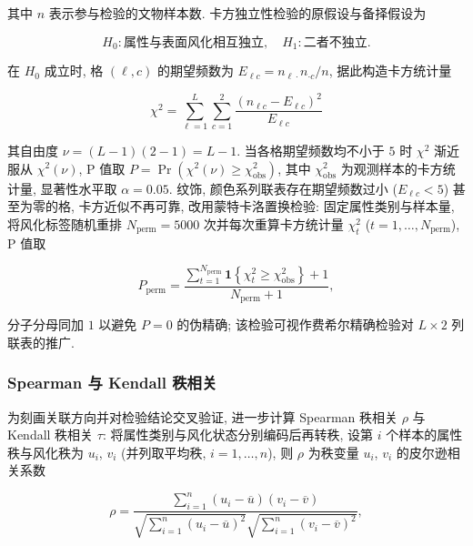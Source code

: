 \documentclass{ctexart}
\begin{document}
其中 $n$ 表示参与检验的文物样本数. 卡方独立性检验的原假设与备择假设为

\begin{equation*}
H_{0}:\text{属性与表面风化相互独立},\quad{}H_{1}:\text{二者不独立}.
\end{equation*}

在 $H_{0}$ 成立时, 格 $\left(\ell,c\right)$ 的期望频数为 $E_{\ell{}c}=n_{\ell\cdot}n_{\cdot{}c}/n$, 据此构造卡方统计量

\begin{equation*}
\chi^{2}=\sum_{\ell=1}^{L}\sum_{c=1}^{2}\frac{\left(n_{\ell{}c}-E_{\ell{}c}\right)^{2}}{E_{\ell{}c}}
\end{equation*}

其自由度 $\nu=\left(L-1\right)\left(2-1\right)=L-1$. 当各格期望频数均不小于 $5$ 时 $\chi^{2}$ 渐近服从 $\chi^{2}\left(\nu\right)$, P 值取 $P=\Pr\left(\chi^{2}\left(\nu\right)\ge\chi_{\mathrm{obs}}^{2}\right)$, 其中 $\chi_{\mathrm{obs}}^{2}$ 为观测样本的卡方统计量, 显著性水平取 $\alpha=0.05$. 纹饰, 颜色系列联表存在期望频数过小 ($E_{\ell{}c}<5$) 甚至为零的格, 卡方近似不再可靠, 改用蒙特卡洛置换检验: 固定属性类别与样本量, 将风化标签随机重排 $N_{\mathrm{perm}}=5000$ 次并每次重算卡方统计量 $\chi_{t}^{2}$ ($t=1,\dots,N_{\mathrm{perm}}$), P 值取

\begin{equation*}
P_{\mathrm{perm}}=\frac{\sum_{t=1}^{N_{\mathrm{perm}}}\mathbf{1}\left\{\chi_{t}^{2}\ge\chi_{\mathrm{obs}}^{2}\right\}+1}{N_{\mathrm{perm}}+1},
\end{equation*}

分子分母同加 $1$ 以避免 $P=0$ 的伪精确; 该检验可视作费希尔精确检验对 $L\times2$ 列联表的推广.


\subsubsection{Spearman 与 Kendall 秩相关}

为刻画关联方向并对检验结论交叉验证, 进一步计算 Spearman 秩相关 $\rho$ 与 Kendall 秩相关 $\tau$: 将属性类别与风化状态分别编码后再转秩, 设第 $i$ 个样本的属性秩与风化秩为 $u_{i}$, $v_{i}$ (并列取平均秩, $i=1,\dots,n$), 则 $\rho$ 为秩变量 $u_{i}$, $v_{i}$ 的皮尔逊相关系数

\begin{equation*}
\rho=\frac{\sum_{i=1}^{n}\left(u_{i}-\overline{u}\right)\left(v_{i}-\overline{v}\right)}{\sqrt{\sum_{i=1}^{n}\left(u_{i}-\overline{u}\right)^{2}}\sqrt{\sum_{i=1}^{n}\left(v_{i}-\overline{v}\right)^{2}}},
\end{equation*}
\end{document}

